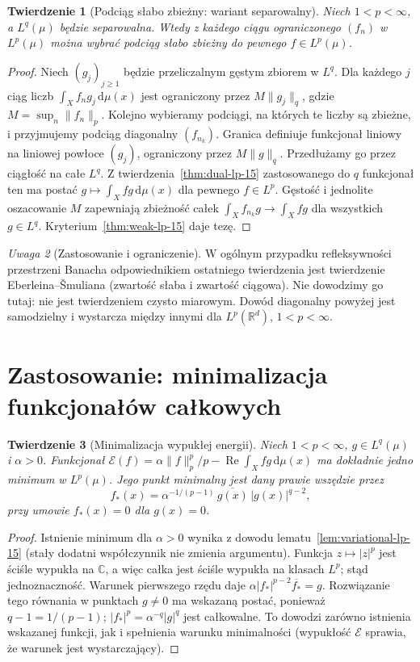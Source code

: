 \documentclass[11pt,a4paper,oneside]{book}
\numberwithin{equation}{chapter}
\theoremstyle{plain}
\newtheorem{twierdzenie}{Twierdzenie}[chapter]
\theoremstyle{definition}
\theoremstyle{remark}
\newtheorem{uwaga}[twierdzenie]{Uwaga}
\begin{document}
\begin{twierdzenie}[Podciąg słabo zbieżny: wariant separowalny]
\label{thm:weak-subseq-15}
Niech $1<p<\infty$, a $L^q(\mu)$ będzie separowalna.
Wtedy z każdego ciągu ograniczonego $(f_n)$ w $L^p(\mu)$
można wybrać podciąg słabo zbieżny do pewnego $f\in L^p(\mu)$.
\end{twierdzenie}
\begin{proof}
Niech $(g_j)_{j\ge1}$ będzie przeliczalnym gęstym
zbiorem w $L^q$. Dla każdego $j$ ciąg liczb
$\int_Xf_n g_j\,\mathrm d\mu(x)$ jest ograniczony przez
$M\|g_j\|_q$, gdzie $M=\sup_n\|f_n\|_p$.
Kolejno wybieramy podciągi, na których te liczby
są zbieżne, i przyjmujemy podciąg diagonalny
$(f_{n_k})$. Granica definiuje funkcjonał liniowy na
liniowej powłoce $(g_j)$, ograniczony przez $M\|g\|_q$.
Przedłużamy go przez ciągłość na całe $L^q$.
Z twierdzenia~\ref{thm:dual-lp-15} zastosowanego do $q$
funkcjonał ten ma postać $g\mapsto\int_Xfg\,\mathrm d\mu(x)$
dla pewnego $f\in L^p$. Gęstość i jednolite
oszacowanie $M$ zapewniają zbieżność całek
$\int_Xf_{n_k}g\to\int_Xfg$ dla wszystkich $g\in L^q$.
Kryterium~\ref{thm:weak-lp-15} daje tezę.
\end{proof}

\begin{uwaga}[Zastosowanie i ograniczenie]
W ogólnym przypadku refleksywności przestrzeni Banacha
odpowiednikiem ostatniego twierdzenia jest twierdzenie
Eberleina--\v Smuliana (zwartość słaba i zwartość ciągowa).
Nie dowodzimy go tutaj: nie jest twierdzeniem czysto
miarowym. Dowód diagonalny powyżej jest samodzielny
i wystarcza między innymi dla $L^p(\mathbb R^d)$,
$1<p<\infty$.
\end{uwaga}

\section{Zastosowanie: minimalizacja funkcjonałów całkowych}
\begin{twierdzenie}[Minimalizacja wypukłej energii]
\label{thm:minimize-lp-15}
Niech $1<p<\infty$, $g\in L^q(\mu)$ i $\alpha>0$.
Funkcjonał $\mathcal E(f)=\alpha\|f\|_p^p/p
-\operatorname{Re}\int_X f g\,\mathrm d\mu(x)$
ma dokładnie jedno minimum w $L^p(\mu)$. Jego
punkt minimalny jest dany prawie wszędzie przez
\[
f_*(x)=\alpha^{-1/(p-1)}\,\overline{g(x)}\,|g(x)|^{q-2},
\]
przy umowie $f_*(x)=0$ dla $g(x)=0$.
\end{twierdzenie}
\begin{proof}
Istnienie minimum dla $\alpha>0$ wynika z dowodu
lematu~\ref{lem:variational-lp-15} (stały dodatni
współczynnik nie zmienia argumentu). Funkcja
$z\mapsto|z|^p$ jest ściśle wypukła na $\mathbb C$,
a więc całka jest ściśle wypukła na klasach $L^p$;
stąd jednoznaczność. Warunek pierwszego rzędu daje
$\alpha|f_*|^{p-2}\overline{f_*}=g$.
Rozwiązanie tego równania w punktach $g\ne0$
ma wskazaną postać, ponieważ $q-1=1/(p-1)$;
$|f_*|^p=\alpha^{-q}|g|^q$ jest całkowalne.
To dowodzi zarówno istnienia wskazanej funkcji,
jak i spełnienia warunku minimalności (wypukłość
$\mathcal E$ sprawia, że warunek jest wystarczający).
\end{proof}
\end{document}
